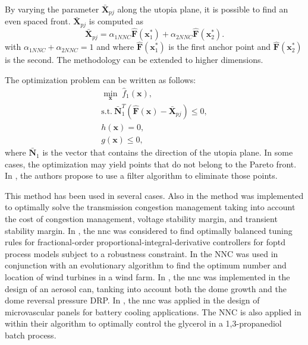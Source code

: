By varying the parameter $\bar{\mathbf{X}}_{pj}$ along the utopia plane, it is possible to find an even spaced front. $\bar{\mathbf{X}}_{pj}$ is computed as%
%
\begin{equation}
\bar{\mathbf{X}}_{pj}= \alpha_{1NNC} \mathbf{\hat{F}}(\mathbf{x}_1^*)+\alpha_{2NNC} \mathbf{\hat{F}}(\mathbf{x}_2^*).
\label{eq:Xpj}
\end{equation}%
%
with $\alpha_{1NNC}+\alpha_{2NNC}=1$ and where $\mathbf{\hat{F}}(\mathbf{x}_1^*)$ is the first anchor point and $\mathbf{\hat{F}}(\mathbf{x}_2^*)$ is the second. The methodology can be extended to higher dimensions.

The optimization problem can be written as follows:
%
\begin{equation}
\begin{gathered}
\min_{\mathbf{x}}{\; \hat{f}_{1}(\mathbf{x})}, \\
\text{s.t.} \ \bar{\mathbf{N}}_1^T \left(\hat{\mathbf{F}}(\mathbf{x})-\bar{\mathbf{X}}_{pj}\right) \leq 0,\\
h(\mathbf{x})=0, \\
g(\mathbf{x}) \leq 0,
\end{gathered}
\label{eq:NNCProblem}
\end{equation}
%
where $\bar{\mathbf{N}}_1$ is the vector that contains the direction of the utopia plane. In some cases, the optimization may yield points that do not belong to the Pareto front. In \citet{Messac2003}, the authors propose to use a filter algorithm to eliminate those points.

This method has been used in several cases. Also in \citet{Hosseini2016a} the method was implemented to optimally solve the transmission congestion management taking into account the cost of congestion management, voltage stability margin, and transient stability margin. In \citet{Sanchez2017a}, the \gls{nnc} was considered to find optimally balanced tuning rules for fractional-order proportional-integral-derivative controllers for \gls{foptd} process models subject to a robustness constraint. In \citet{Mittal2017a} the NNC was used in conjunction with an evolutionary algorithm to find the optimum number and location of wind turbines in a wind farm. In \citet{Benki2018}, the \gls{nnc} was implemented in the design of an aerosol can, tanking into account both the dome growth and the dome reversal pressure DRP. In \citet{Tan2018a}, the \gls{nnc} was applied in the design of microvascular panels for battery cooling applications. The NNC is also applied in \citet{Liu2019} within their algorithm to optimally control the glycerol in a 1,3-propanediol batch process.

